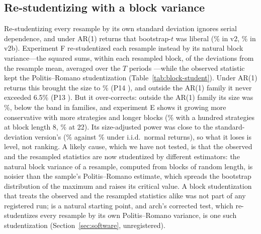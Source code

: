 \subsection{Re-studentizing with a block variance}
\label{sec:block-student}
Re-studentizing every resample by its own standard deviation ignores serial dependence, and under AR(1) returns that bootstrap-$t$ was liberal (\% in v2, \% in v2b). Experiment F re-studentized each resample instead by its natural block variance---the squared sums, within each resampled block, of the deviations from the resample mean, averaged over the $T$ periods \citep{gotze1996second}---while the observed statistic kept the Politis--Romano studentization (Table~\ref{tab:block-student}). Under AR(1) returns this brought the size to \% (P14 ), and outside the AR(1) family it never exceeded 6.5\% (P13 ). But it over-corrects: outside the AR(1) family its size was \%, below the band in  families, and experiment E shows it growing more conservative with more strategies and longer blocks (\% with a hundred strategies at block length 8, \% at 22). Its size-adjusted power was close to the standard-deviation version's (\% against \% under i.i.d.\ normal returns), so what it loses is level, not ranking. A likely cause, which we have not tested, is that the observed and the resampled statistics are now studentized by different estimators: the natural block variance of a resample, computed from blocks of random length, is noisier than the sample's Politis--Romano estimate, which spreads the bootstrap distribution of the maximum and raises its critical value. A block studentization that treats the observed and the resampled statistics alike was not part of any registered run; \citet{goncalves2011block} is a natural starting point, and arch's corrected test, which re-studentizes every resample by its own Politis--Romano variance, is one such studentization (Section~\ref{sec:software}, unregistered).

